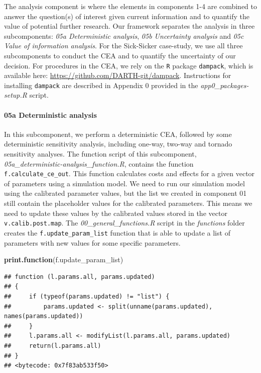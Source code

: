 \documentclass[]{article}
\newenvironment{Shaded}{\begin{snugshade}}{\end{snugshade}}
\newcommand{\KeywordTok}[1]{\textcolor[rgb]{0.13,0.29,0.53}{\textbf{#1}}}
\newcommand{\NormalTok}[1]{#1}
\let\oldparagraph\paragraph
\renewcommand{\paragraph}[1]{\oldparagraph{#1}\mbox{}}
\begin{document}
The analysis component is where the elements in components 1-4 are
combined to answer the question(s) of interest given current information
and to quantify the value of potential further research. Our framework
separates the analysis in three subcomponents: \emph{05a Deterministic
analysis}, \emph{05b Uncertainty analysis} and \emph{05c Value of
information analysis}. For the Sick-Sicker case-study, we use all three
subcomponents to conduct the CEA and to quantify the uncertainty of our
decision. For procedures in the CEA, we rely on the \texttt{R} package
\texttt{dampack}, which is available here:
\url{https://github.com/DARTH-git/dampack}. Instructions for installing
\texttt{dampack} are described in Appendix 0 provided in the
\emph{app0\_packages-setup.R} script.

\paragraph{05a Deterministic analysis}\label{a-deterministic-analysis}

In this subcomponent, we perform a deterministic CEA, followed by some
deterministic sensitivity analysis, including one-way, two-way and
tornado sensitivity analyses. The function script of this subcomponent,
\emph{05a\_deterministic-analysis\_function.R}, contains the function
\texttt{f.calculate\_ce\_out}. This function calculates costs and
effects for a given vector of parameters using a simulation model. We
need to run our simulation model using the calibrated parameter values,
but the list we created in component 01 still contain the placeholder
values for the calibrated parameters. This means we need to update these
values by the calibrated values stored in the vector
\texttt{v.calib.post.map}. The \emph{00\_general\_functions.R} script in
the \emph{functions} folder creates the \texttt{f.update\_param\_list}
function that is able to update a list of parameters with new values for
some specific parameters.

\begin{Shaded}
\begin{Highlighting}[]
\KeywordTok{print.function}\NormalTok{(f.update_param_list)}
\end{Highlighting}
\end{Shaded}

\begin{verbatim}
## function (l.params.all, params.updated) 
## {
##     if (typeof(params.updated) != "list") {
##         params.updated <- split(unname(params.updated), names(params.updated))
##     }
##     l.params.all <- modifyList(l.params.all, params.updated)
##     return(l.params.all)
## }
## <bytecode: 0x7f83ab533f50>
\end{verbatim}
\end{document}
